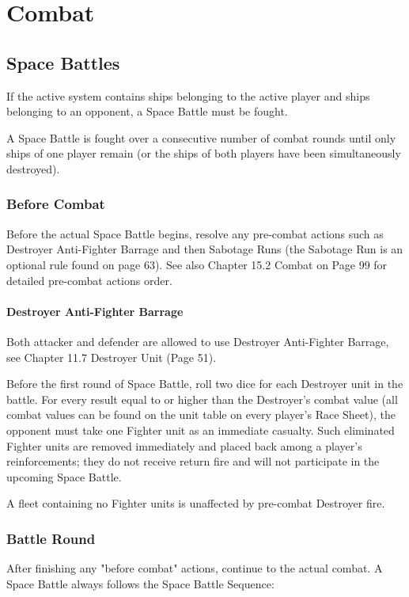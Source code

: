 \documentclass[11pt,fleqn]{book} %
\begin{document}
\chapter{Combat}


\section{Space Battles}
If the active system contains ships belonging to the active player and ships belonging to an opponent, a
Space Battle must be fought.

A Space Battle is fought over a consecutive number of combat rounds until only ships of one player remain (or the ships of both players have been simultaneously destroyed).

\subsection{Before Combat}
Before the actual Space Battle begins, resolve any pre-combat actions such as Destroyer Anti-Fighter
Barrage and then Sabotage Runs (the Sabotage Run is an optional rule found on page 63).
See also Chapter 15.2 Combat on Page 99 for detailed pre-combat actions order.

\subsubsection{Destroyer Anti-Fighter Barrage}

Both attacker and defender are allowed to use Destroyer Anti-Fighter Barrage, see Chapter 11.7 Destroyer Unit (Page 51).

Before the first round of Space Battle, roll two dice for each Destroyer unit in the battle. For every result equal to or higher than the Destroyer's combat value (all combat values can be found on the unit table on every player's Race Sheet), the opponent must take one Fighter unit as an immediate casualty. Such eliminated Fighter units are removed immediately and placed back among a player's reinforcements; they do not receive return fire and will not participate in the upcoming Space Battle.

A fleet containing no Fighter units is unaffected by pre-combat Destroyer fire.
\subsection{Battle Round}
After finishing any "before combat" actions, continue to the actual combat. A Space Battle always follows the Space Battle Sequence:
\end{document}
